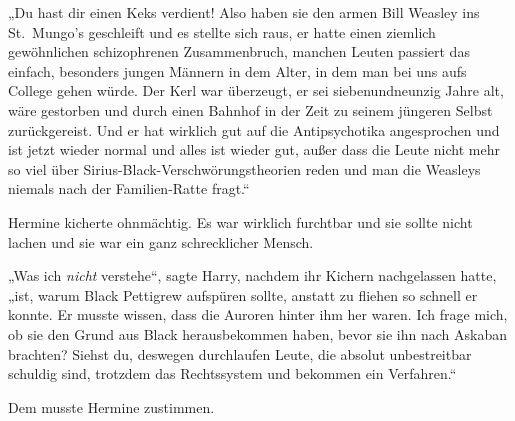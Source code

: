 „Du hast dir einen Keks verdient! Also haben sie den armen Bill Weasley ins St.~Mungo’s geschleift und es stellte sich raus, er hatte einen ziemlich gewöhnlichen schizophrenen Zusammenbruch, manchen Leuten passiert das einfach, besonders jungen Männern in dem Alter, in dem man bei uns aufs College gehen würde. Der Kerl war überzeugt, er sei siebenundneunzig Jahre alt, wäre gestorben und durch einen Bahnhof in der Zeit zu seinem jüngeren Selbst zurückgereist. Und er hat wirklich gut auf die Antipsychotika angesprochen und ist jetzt wieder normal und alles ist wieder gut, außer dass die Leute nicht mehr so viel über Sirius-Black-Verschwörungstheorien reden und man die Weasleys niemals nach der Familien-Ratte fragt.“

Hermine kicherte ohnmächtig. Es war wirklich furchtbar und sie sollte nicht lachen und sie war ein ganz schrecklicher Mensch.

„Was ich \emph{nicht} verstehe“, sagte Harry, nachdem ihr Kichern nachgelassen hatte, „ist, warum Black Pettigrew aufspüren sollte, anstatt zu fliehen so schnell er konnte. Er musste wissen, dass die Auroren hinter ihm her waren. Ich frage mich, ob sie den Grund aus Black herausbekommen haben, bevor sie ihn nach Askaban brachten? Siehst du, deswegen durchlaufen Leute, die absolut unbestreitbar schuldig sind, trotzdem das Rechtssystem und bekommen ein Verfahren.“

Dem musste Hermine zustimmen.

